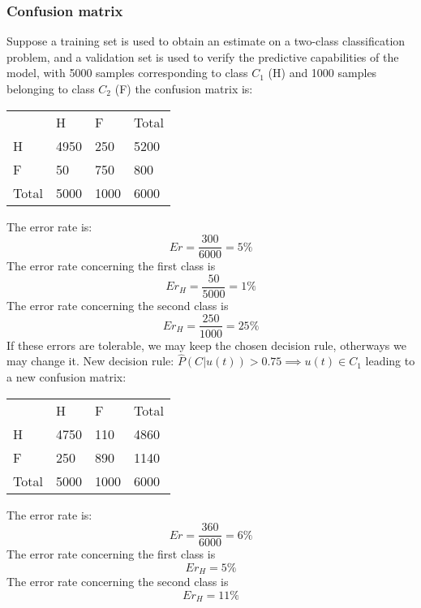 \documentclass{book}
\theoremstyle{definition}
\theoremstyle{remark}
\theoremstyle{remark}
\begin{document}
\subsubsection{Confusion matrix}
Suppose a training set is used to obtain an estimate on a two-class classification problem, and a validation set is used to verify the predictive capabilities of the model, with 5000 samples corresponding to class $C_1$ (H) and 1000 samples belonging to class $C_2$ (F) the confusion matrix is:
\begin{table}[H]
\begin{tabular}{llll}
                           & H                         & F                         & Total                     \\ \cline{2-4} 
\multicolumn{1}{l|}{H}     & \multicolumn{1}{l|}{4950} & \multicolumn{1}{l|}{250}  & \multicolumn{1}{l|}{5200} \\ \cline{2-4} 
\multicolumn{1}{l|}{F}     & \multicolumn{1}{l|}{50}   & \multicolumn{1}{l|}{750}  & \multicolumn{1}{l|}{800}  \\ \cline{2-4} 
\multicolumn{1}{l|}{Total} & \multicolumn{1}{l|}{5000} & \multicolumn{1}{l|}{1000} & \multicolumn{1}{l|}{6000} \\ \cline{2-4} 
\end{tabular}
\end{table}
The error rate is:
\[
    Er = \displaystyle\frac{300}{6000}=5\%
\]
The error rate concerning the first class is 
\[
    Er_H = \displaystyle\frac{50}{5000}=1\%
\]
The error rate concerning the second class is 
\[
    Er_H = \displaystyle\frac{250}{1000}=25\%
\]
If these errors are tolerable, we may keep the chosen decision rule, otherways we may change it. New decision rule: $\hat{P}(C|u(t))>0.75 \implies u(t)\in C_1$ leading to a new confusion matrix: 
\begin{table}[H]
\begin{tabular}{llll}
                           & H                         & F                         & Total                     \\ \cline{2-4} 
\multicolumn{1}{l|}{H}     & \multicolumn{1}{l|}{4750} & \multicolumn{1}{l|}{110}  & \multicolumn{1}{l|}{4860} \\ \cline{2-4} 
\multicolumn{1}{l|}{F}     & \multicolumn{1}{l|}{250}  & \multicolumn{1}{l|}{890}  & \multicolumn{1}{l|}{1140} \\ \cline{2-4} 
\multicolumn{1}{l|}{Total} & \multicolumn{1}{l|}{5000} & \multicolumn{1}{l|}{1000} & \multicolumn{1}{l|}{6000} \\ \cline{2-4} 
\end{tabular}
\end{table}
The error rate is:
\[
    Er = \displaystyle\frac{360}{6000}=6\%
\]
The error rate concerning the first class is 
\[
    Er_H = 5\%
\]
The error rate concerning the second class is 
\[
    Er_H = 11\%
\]
\end{document}
